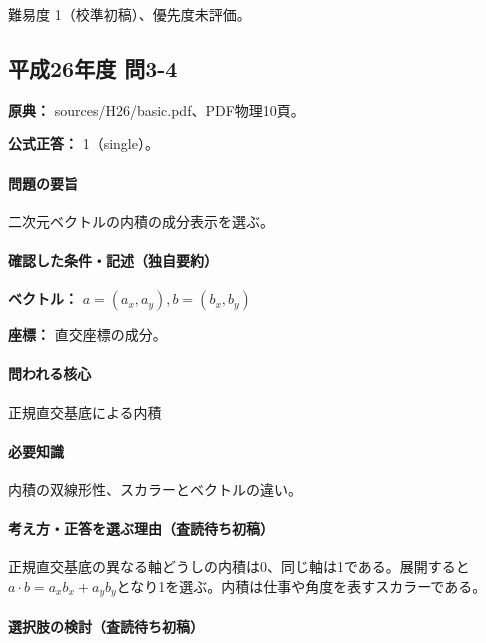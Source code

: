 \par 難易度 1（校準初稿）、優先度未評価。

\subsection{平成26年度 問3-4}
\label{q:h26-reg-basic-3-4}

\noindent\textbf{原典：} sources/H26/basic.pdf、PDF物理10頁。

\textbf{公式正答：} 1（single）。

\paragraph{問題の要旨} 二次元ベクトルの内積の成分表示を選ぶ。

\paragraph{確認した条件・記述（独自要約）}\mbox{}\par

\noindent\textbf{ベクトル：} \(a=(a_x,a_y),b=(b_x,b_y)\)\par

\noindent\textbf{座標：} 直交座標の成分。\par

\paragraph{問われる核心} 正規直交基底による内積

\paragraph{必要知識} 内積の双線形性、スカラーとベクトルの違い。

\paragraph{考え方・正答を選ぶ理由（査読待ち初稿）} 正規直交基底の異なる軸どうしの内積は0、同じ軸は1である。展開すると\(a\cdot b=a_xb_x+a_yb_y\)となり1を選ぶ。内積は仕事や角度を表すスカラーである。

\paragraph{選択肢の検討（査読待ち初稿）}\mbox{}\par

